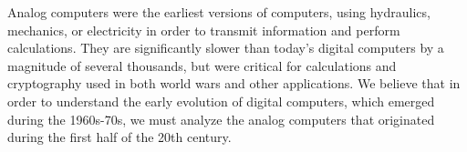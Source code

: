 \documentclass[../computer-history.tex]{subfiles}
\begin{document}
\centering


Analog computers were the earliest versions of computers, using hydraulics, mechanics, or electricity in order to transmit information and perform calculations. They are significantly
slower than today's digital computers by a magnitude of several thousands, but were critical for calculations and cryptography used in both world wars and other applications.
We believe that in order to understand the early evolution of digital computers, which emerged during the 1960s-70s, we must analyze the analog computers that originated
during the first half of the 20th century\cite{wiki}.



\end{document}
